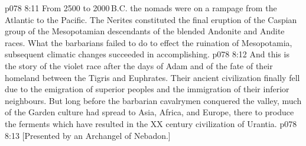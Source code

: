 \vs p078 8:11 From 2500 to 2000\,B.C. the nomads were on a rampage from the Atlantic to the Pacific. The Nerites constituted the final eruption of the Caspian group of the Mesopotamian descendants of the blended Andonite and Andite races. What the barbarians failed to do to effect the ruination of Mesopotamia, subsequent climatic changes succeeded in accomplishing.
\vs p078 8:12 \pc And this is the story of the violet race after the days of Adam and of the fate of their homeland between the Tigris and Euphrates. Their ancient civilization finally fell due to the emigration of superior peoples and the immigration of their inferior neighbours. But long before the barbarian cavalrymen conquered the valley, much of the Garden culture had spread to Asia, Africa, and Europe, there to produce the ferments which have resulted in the XX century civilization of Urantia.
\vsetoff
\vs p078 8:13 [Presented by an Archangel of Nebadon.]
\quizlink
{}
